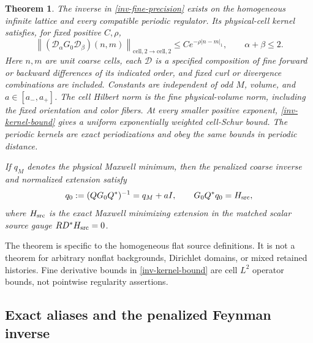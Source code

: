 \documentclass[11pt]{article}
\newtheorem{theorem}{Theorem}[section]
\theoremstyle{remark}
\newcommand{\norm}[1]{\left\|#1\right\|}
\begin{document}
\begin{theorem}\label{inv-theorem}
The inverse in \eqref{inv-fine-precision} exists on the homogeneous
infinite lattice and every compatible periodic regulator. Its
physical-cell kernel satisfies, for fixed positive $C,\rho$,
\begin{equation}\label{inv-kernel-bound}
 \norm{(\mathcal D_\alpha G_0\mathcal D_\beta)(n,m)}
 _{\mathrm{cell},2\to\mathrm{cell},2}
 \le Ce^{-\rho|n-m|_1},\qquad \alpha+\beta\le2.
\end{equation}
Here $n,m$ are unit coarse cells, each $\mathcal D$ is a specified
composition of fine forward or backward differences of its indicated
order, and fixed curl or divergence combinations are included.
Constants are independent of odd $M$, volume, and $a\in[a_-,a_+]$.
The cell Hilbert norm is the fine physical-volume norm, including the
fixed orientation and color fibers. At every smaller positive exponent,
\eqref{inv-kernel-bound} gives a uniform exponentially weighted
cell-Schur bound. The periodic kernels are exact periodizations and
obey the same bounds in periodic distance.

If $q_M$ denotes the physical Maxwell minimum, then the penalized
coarse inverse and normalized extension satisfy
\begin{equation}\label{inv-coarse-result}
 q_0:=(QG_0Q^*)^{-1}=q_M+aI,
 \qquad G_0Q^*q_0=H_{\rm src},
\end{equation}
where $H_{\rm src}$ is the exact Maxwell minimizing extension in the
matched scalar source gauge $RD^*H_{\rm src}=0$.
\end{theorem}

The theorem is specific to the homogeneous flat source definitions.
It is not a theorem for arbitrary nonflat backgrounds, Dirichlet
domains, or mixed retained histories. Fine derivative bounds in
\eqref{inv-kernel-bound} are cell $L^2$ operator bounds, not
pointwise regularity assertions.

\subsection{Exact aliases and the penalized Feynman inverse}
\end{document}
